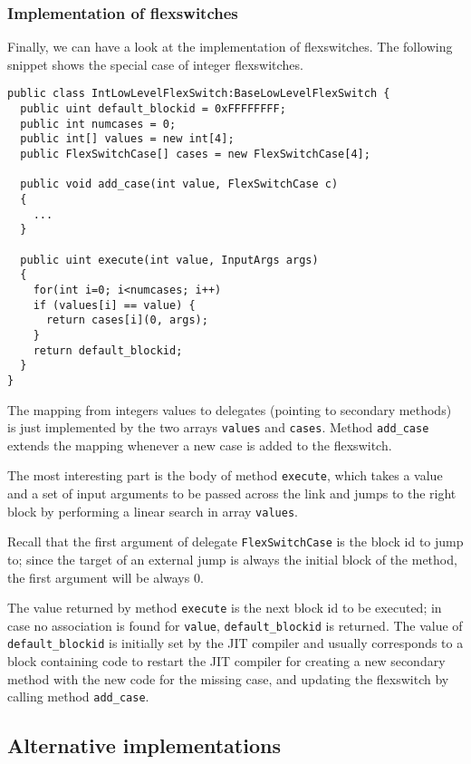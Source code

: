 \subsubsection{Implementation of flexswitches}
Finally, we can have a look at the implementation of flexswitches.
The following snippet shows the special case of integer flexswitches.
\begin{small}
\begin{lstlisting}[language={[Sharp]C}] 
public class IntLowLevelFlexSwitch:BaseLowLevelFlexSwitch {
  public uint default_blockid = 0xFFFFFFFF;
  public int numcases = 0;
  public int[] values = new int[4];
  public FlexSwitchCase[] cases = new FlexSwitchCase[4];

  public void add_case(int value, FlexSwitchCase c)
  {
    ...
  }

  public uint execute(int value, InputArgs args)
  {
    for(int i=0; i<numcases; i++)
    if (values[i] == value) {
      return cases[i](0, args);
    }
    return default_blockid;
  }
}
\end{lstlisting}
\end{small}
The mapping from integers values to delegates (pointing to secondary
methods) is just implemented by the two arrays \lstinline{values} and
\lstinline{cases}. Method \lstinline{add_case} extends the mapping
whenever a new case is added to the flexswitch.
  
The most interesting part is the body of method \lstinline{execute},
which takes a value and a set of input arguments to be passed across
the link and jumps to the right block by performing a linear search in
array \lstinline{values}.

Recall that the first argument of delegate \lstinline{FlexSwitchCase}
is the block id to jump to; since the target of an external jump is
always the initial block of the method, the first argument will be
always 0.

The value returned by method \lstinline{execute} is the next block id
to be executed; 
in case no association is found for \lstinline{value},
\lstinline{default_blockid} is returned. The value of
\lstinline{default_blockid} is initially set by the JIT compiler and
usually corresponds to a block containing code to restart the JIT
compiler for creating a new secondary method with the new code for the
missing case, and updating the flexswitch by calling method
\lstinline{add_case}.

\subsection{Alternative implementations}

